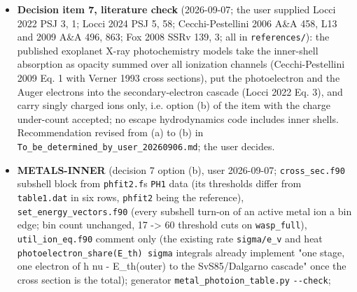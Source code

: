 \documentclass[english,a4paper]{my_memo}
\begin{document}
\begin{itemize}
  depth \texttt{sqrt(pi)\ tau\_0} (normalized profile; equal to Hollenbach and McKee
  1979 eq. (5.10) once the convention is matched, 3.4 percent at worst over
  tau = 3 to 1e6) while the caller passed the line-center column: beta too
  large by 1 (thin) to 2.11 (branch point) to 1.77 (asymptotic). \textbf{Fixed:}
  each cell\textquotesingle s depth is now \texttt{sqrt(pi)} times the line-center depth in
  \texttt{fine\_structure\_line\_transfer}. MEASURED regime on the shipped columns:
  largest line-center depth 0.14 ({[}O I{]} 63 um at the hot-Uranus base), so the
  factor there is 1.12 and the change of the total radiative losses is below
  0.1 percent (\texttt{mol\_metals} 0.096 percent), but a factor of two in any base
  thick in these lines and in the \texttt{Base\ IR\ field} incident term the same
  beta scales. \texttt{physics\_probe} 1291/0 after the fix. Metals cases move at
  the gate at that level.
\item
  \textbf{Decision item 7, literature check} (2026-09-07; the user supplied
  Locci 2022 PSJ 3, 1; Locci 2024 PSJ 5, 58; Cecchi-Pestellini 2006 A\&A
  458, L13 and 2009 A\&A 496, 863; Fox 2008 SSRv 139, 3; all in
  \texttt{references/}): the published exoplanet X-ray photochemistry models take
  the inner-shell absorption as opacity summed over all ionization channels
  (Cecchi-Pestellini 2009 Eq. 1 with Verner 1993 cross sections), put the
  photoelectron and the Auger electrons into the secondary-electron cascade
  (Locci 2022 Eq. 3), and carry singly charged ions only, i.e. option (b) of
  the item with the charge under-count accepted; no escape hydrodynamics
  code includes inner shells. Recommendation revised from (a) to (b) in
  \texttt{To\_be\_determined\_by\_user\_20260906.md}; the user decides.
\item
  \textbf{METALS-INNER} (decision 7 option (b), user 2026-09-07; \texttt{cross\_sec.f90}
  subshell block from \texttt{phfit2.f}\textquotesingle s \texttt{PH1} data (its thresholds differ from
  \texttt{table1.dat} in six rows, \texttt{phfit2} being the reference),
  \texttt{set\_energy\_vectors.f90} (every subshell turn-on of an active metal ion a
  bin edge; bin count unchanged, 17 -\textgreater{} 60 threshold cuts on \texttt{wasp\_full}),
  \texttt{util\_ion\_eq.f90} comment only (the existing rate \texttt{sigma/e\_v} and heat
  \texttt{photoelectron\_share(E\_th)\ sigma} integrals already implement "one stage,
  one electron of h nu - E\_th(outer) to the SvS85/Dalgarno cascade" once the
  cross section is the total); generator \texttt{metal\_photoion\_table.py} \texttt{-\/-check};

\end{itemize}
\end{document}
